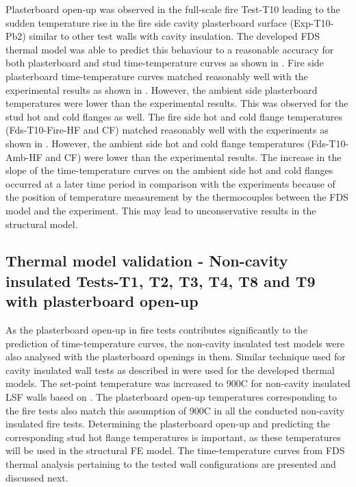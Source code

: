 Plasterboard open-up was observed in the full-scale fire Test-T10 leading to the sudden temperature rise in the fire side cavity plasterboard surface (Exp-T10-Pb2) similar to other test walls with cavity insulation. The developed FDS thermal model was able to predict this behaviour to a reasonable accuracy for both plasterboard and stud time-temperature curves as shown in . Fire side plasterboard time-temperature curves matched reasonably well with the experimental results as shown in . However, the ambient side plasterboard temperatures were lower than the experimental results. This was observed for the stud hot and cold flanges as well. The fire side hot and cold flange temperatures (Fds-T10-Fire-HF and CF) matched reasonably well with the experiments as shown in . However, the ambient side hot and cold flange temperatures (Fds-T10-Amb-HF and CF) were lower than the experimental results. The increase in the slope of the time-temperature curves on the ambient side hot and cold flanges occurred at a later time period in comparison with the experiments because of the position of temperature measurement by the thermocouples between the FDS model and the experiment. This may lead to unconservative results in the structural model. 

\subsection{Thermal model validation - Non-cavity insulated Tests-T1, T2, T3, T4, T8 and T9 with plasterboard open-up} \label{sec:thermal-model-non-cav}

As the plasterboard open-up in fire tests contributes significantly to the prediction of time-temperature curves, the non-cavity insulated test models were also analysed with the plasterboard openings in them. Similar technique used for cavity insulated wall tests as described in  were used for the developed thermal models. The set-point temperature was increased to 900\degree C for non-cavity insulated LSF walls based on \citet{Sultan2015}. The plasterboard open-up temperatures corresponding to the fire tests also match this assumption of 900\degree C in all the conducted non-cavity insulated fire tests. Determining the plasterboard open-up and predicting the corresponding stud hot flange temperatures is important, as these temperatures will be used in the structural FE model. The time-temperature curves from FDS thermal analysis pertaining to the tested wall configurations are presented and discussed next.

